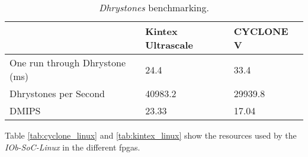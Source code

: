 \begin{table}[!ht]
    \centering
    \begin{tabular}{l|l|l|}
    \cline{2-3}
                                                         & \textbf{Kintex Ultrascale} & \textbf{CYCLONE V} \\ \hline
    \multicolumn{1}{|l|}{One run through Dhrystone (ms)} & 24.4                       & 33.4               \\ \hline
    \multicolumn{1}{|l|}{Dhrystones per Second}          & 40983.2                    & 29939.8            \\ \hline
    \multicolumn{1}{|l|}{DMIPS}                          & 23.33                      & 17.04            \\ \hline
    \end{tabular}
    \caption{\textit{Dhrystones} benchmarking.}
    \label{tab:dhrystones}
\end{table}

Table \ref{tab:cyclone_linux} and \ref{tab:kintex_linux} show the resources used by the \textit{IOb-SoC-Linux} in the different \acrshort{fpga}s. 

